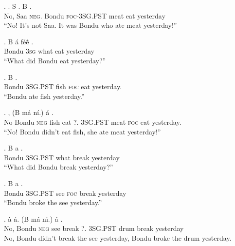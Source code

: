 \documentclass{assets/fieldnotes}
\begin{document}
\exg. . S . B    .\\
No, Saa \textsc{neg}. Bondu \textsc{foc-3SG.PST} meat eat yesterday\\
``No! It's not Saa. It was Bondu who ate meat yesterday!''

\exg. B \'a f\'e\'{\~e}  .\\
Bondu \textsc{3sg} what eat yesterday\\
``What did Bondu eat yesterday?''

\exg. B     .\\
Bondu \textsc{3SG.PST} fish \textsc{foc} eat yesterday.\\
``Bondu ate fish yesterday.''

\exg. , (B m\'a   n\'i.) \'a    .\\ 
No Bondu \textsc{neg} fish eat ?. 3\textsc{SG.PST} meat \textsc{foc} eat yesterday.\\
``No! Bondu didn't eat fish, she ate meat yesterday!''


\exg. B a   .\\
Bondu \textsc{3SG.PST} what break yesterday\\
``What did Bondu break yesterday?''

\exg. B a    .\\
Bondu \textsc{3SG.PST} see \textsc{foc} break yesterday\\
``Bondu broke the see yesterday.''

\exg. \`a \'a. (B m\'a   n\`i.) \'a   .\\
No, Bondu \textsc{neg} see break ?. \textsc{3SG.PST} drum break yesterday\\
No, Bondu didn't break the see yesterday, Bondu broke the drum yesterday.
\end{document}

